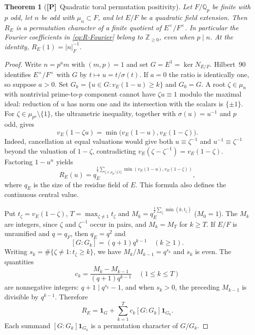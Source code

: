 \documentclass[11pt]{article}
\newcommand{\Ptag}{\textnormal{\textbf{[P]}}}
\theoremstyle{plain}
\newtheorem{theorem}{Theorem}[section]
\theoremstyle{definition}
\begin{document}
\begin{theorem}[\Ptag\ Quadratic toral permutation positivity]
\label{thm:quad-toral}
Let $F/\mathbb Q_p$ be finite with $p$ odd, let $n$ be odd with
$\mu_n\subset F$, and let $E/F$ be a quadratic field extension.
Then $R_E$ is a permutation character of a finite quotient of
$E^\times/F^\times$.  In particular the Fourier coefficients in
\eqref{eq:R-Fourier} belong to $\mathbb Z_{\ge0}$, even when $p\mid n$.
At the identity, $R_E(1)=|n|_F^{-1}$.
\end{theorem}
\begin{proof}
Write $n=p^a m$ with $(m,p)=1$ and set
$G=E^1=\ker N_{E/F}$.  Hilbert~90 identifies $E^\times/F^\times$
with $G$ by $t\mapsto u=t/\sigma(t)$.
If $a=0$ the ratio is identically one, so suppose $a>0$.
Set $G_k=\{u\in G:v_E(1-u)\ge k\}$ and $G_0=G$.
A root $\zeta\in\mu_n$ with nontrivial prime-to-$p$ component
cannot have $\zeta u\equiv1$ modulo the maximal ideal: reduction of
$u$ has norm one and its intersection with the scalars is $\{\pm1\}$.
For $\zeta\in\mu_{p^a}\setminus\{1\}$, the ultrametric inequality,
together with $\sigma(u)=u^{-1}$ and $p$ odd, gives
\[
v_E(1-\zeta u)=\min\bigl(v_E(1-u),v_E(1-\zeta)\bigr).
\]
Indeed, cancellation at equal valuations would give both
$u\equiv\zeta^{-1}$ and $u^{-1}\equiv\zeta^{-1}$ beyond the
valuation of $1-\zeta$, contradicting
$v_E(\zeta-\zeta^{-1})=v_E(1-\zeta)$.
Factoring $1-u^n$ yields
\begin{equation}\label{eq:toralradial}
R_E(u)=q_E^{\frac12\sum_{\zeta\in\mu_{p^a}\setminus\{1\}}
\min(v_E(1-u),v_E(1-\zeta))},
\end{equation}
where $q_E$ is the size of the residue field of $E$.
This formula also defines the continuous central value.

Put $t_\zeta=v_E(1-\zeta)$,
$T=\max_{\zeta\ne1}t_\zeta$ and
$M_k=q_E^{\frac12\sum_\zeta\min(k,t_\zeta)}$ ($M_0=1$).
The $M_k$ are integers, since $\zeta$ and $\zeta^{-1}$ occur
in pairs, and $M_k=M_T$ for $k\ge T$.
If $E/F$ is unramified and $q=q_F$, then $q_E=q^2$ and
\[
[G:G_k]=(q+1)q^{k-1}\quad(k\ge1).
\]
Writing $s_k=\#\{\zeta\ne1:t_\zeta\ge k\}$, we have
$M_k/M_{k-1}=q^{s_k}$ and $s_k$ is even.  The quantities
\[
c_k=\frac{M_k-M_{k-1}}{(q+1)q^{k-1}}
\quad (1\le k\le T)
\]
are nonnegative integers: $q+1\mid q^{s_k}-1$, and when
$s_k>0$, the preceding $M_{k-1}$ is divisible by $q^{k-1}$.
Therefore
\[
R_E=\mathbf1_G+\sum_{k=1}^{T}c_k[G:G_k]\mathbf1_{G_k}.
\]
Each summand $[G:G_k]\mathbf1_{G_k}$ is a permutation
character of $G/G_k$.


\end{proof}
\end{document}
